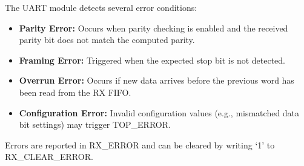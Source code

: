 The UART module detects several error conditions:
\begin{itemize}[noitemsep]
    \item \textbf{Parity Error:} Occurs when parity checking is enabled and the received parity bit does not match the computed parity.
    \item \textbf{Framing Error:} Triggered when the expected stop bit is not detected.
    \item \textbf{Overrun Error:} Occurs if new data arrives before the previous word has been read from the RX FIFO.
    \item \textbf{Configuration Error:} Invalid configuration values (e.g., mismatched data bit settings) may trigger TOP\_ERROR.
\end{itemize}
Errors are reported in RX\_ERROR and can be cleared by writing ‘1’ to RX\_CLEAR\_ERROR.

